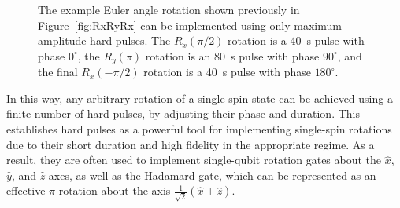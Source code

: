 \begin{figure}[ht]
    \centering
\caption{The example Euler angle rotation shown previously in Figure~\ref{fig:RxRyRx} can be implemented using only maximum amplitude hard pulses. The $R_x(\pi/2)$ rotation is a 40~\textmu s pulse with phase $0^\circ$, the $R_y(\pi)$ rotation is an 80~\textmu s pulse with phase $90^\circ$, and the final $R_x(-\pi/2)$ rotation is a 40~\textmu s pulse with phase $180^\circ$.}
    \label{fig:hardpulse_example}
\end{figure}

In this way, any arbitrary rotation of a single-spin state can be achieved using a finite number of hard pulses, by adjusting their phase and duration. This establishes hard pulses as a powerful tool for implementing single-spin rotations due to their short duration and high fidelity in the appropriate regime. As a result, they are often used to implement single-qubit rotation gates about the \(\hat{x}\), \(\hat{y}\), and \(\hat{z}\) axes, as well as the Hadamard gate, which can be represented as an effective \(\pi\)-rotation about the axis \(\frac{1}{\sqrt{2}}(\hat{x}+\hat{z})\).


